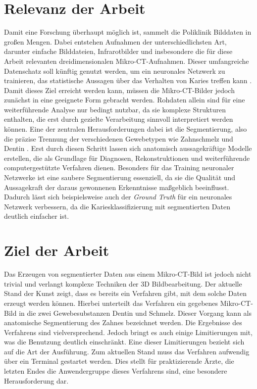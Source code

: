 \section{Relevanz der Arbeit}
\label{sec:relevanz_der_arbeit} Damit eine Forschung überhaupt möglich ist,
sammelt die Poliklinik Bilddaten in großen Mengen. Dabei entstehen Aufnahmen der
unterschiedlichsten Art, darunter einfache Bilddateien, Infrarotbilder und insbesondere
die für diese Arbeit relevanten dreidimensionalen Mikro-\ac{CT}-Aufnahmen. Dieser
umfangreiche Datenschatz soll künftig genutzt werden, um ein neuronales Netzwerk
zu trainieren, das statistische Aussagen über das Verhalten von Karies treffen kann
\citep[vgl.][S.~1]{walter2025projekt}. Damit dieses Ziel erreicht werden kann,
müssen die Mikro-\ac{CT}-Bilder jedoch zunächst in eine geeignete Form gebracht werden.
Rohdaten allein sind für eine weiterführende Analyse nur bedingt nutzbar, da sie
komplexe Strukturen enthalten, die erst durch gezielte Verarbeitung sinnvoll
interpretiert werden können. Eine der zentralen Herausforderungen dabei ist die Segmentierung,
also die präzise Trennung der verschiedenen Gewebetypen wie Zahnschmelz und
Dentin \citep[vgl.][S.~359]{lehmann2013bildverarbeitung}. Erst durch diesen
Schritt lassen sich anatomisch aussagekräftige Modelle erstellen, die als Grundlage
für Diagnosen, Rekonstruktionen und weiterführende computergestützte Verfahren
dienen. Besonders für das Training neuronaler Netzwerke ist eine saubere Segmentierung
essenziell, da sie die Qualität und Aussagekraft der daraus gewonnenen
Erkenntnisse maßgeblich beeinflusst. Dadurch lässt sich beispielsweise auch der \textit{Ground
Truth} für ein neuronales Netzwerk verbessern, da die Kariesklassifizierung mit segmentierten
Daten deutlich einfacher ist.

\section{Ziel der Arbeit}
\label{sec:ziel_der_arbeit} Das Erzeugen von segmentierter Daten aus einem Mikro-\ac{CT}-Bild
ist jedoch nicht trivial und verlangt komplexe Techniken der \ac{3D} Bildbearbeitung.
Der aktuelle Stand der Kunst zeigt, dass es bereits ein Verfahren gibt, mit dem
solche Daten erzeugt werden können. Hierbei unterteilt das Verfahren ein gegebenes
Mikro-\ac{CT}-Bild in die zwei Gewebesubstanzen Dentin und Schmelz. Dieser Vorgang
kann als anatomische Segmentierung des Zahnes bezeichnet werden. Die Ergebnisse
des Verfahrens sind vielversprechend. Jedoch bringt es auch einige Limitierungen
mit, was die Benutzung deutlich einschränkt. Eine dieser Limitierungen bezieht sich
auf die Art der Ausführung. Zum aktuellen Stand muss das Verfahren aufwendig
über ein Terminal gestartet werden. Dies stellt für praktizierende Ärzte, die
letzten Endes die Anwendergruppe dieses Verfahrens sind, eine besondere Herausforderung
dar.

